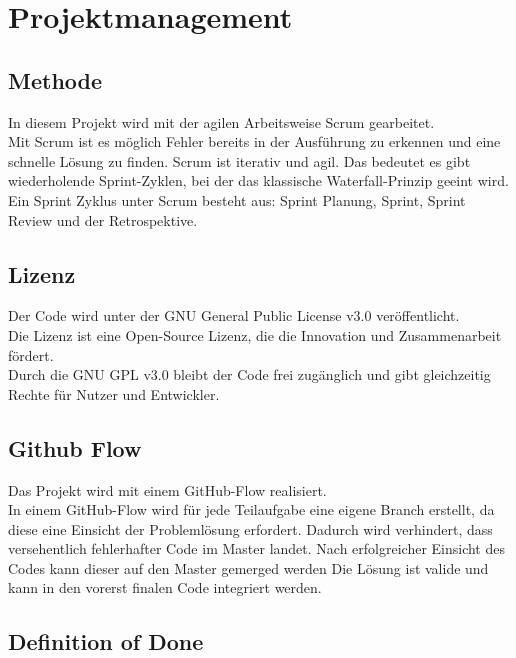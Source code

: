 \chapter{Projektmanagement}\label{ch:projektmanagement}

\section{Methode}\label{sec:methode}

In diesem Projekt wird mit der agilen Arbeitsweise Scrum gearbeitet.\\
Mit Scrum ist es möglich Fehler bereits in der Ausführung zu erkennen und eine schnelle Lösung zu finden.
Scrum ist iterativ und agil. Das bedeutet es gibt wiederholende Sprint-Zyklen, bei der das klassische Waterfall-Prinzip geeint wird.
Ein Sprint Zyklus unter Scrum besteht aus: Sprint Planung, Sprint, Sprint Review und der Retrospektive.

\section{Lizenz}\label{sec:lizenz}

Der Code wird unter der GNU General Public License v3.0 veröffentlicht.\\
Die Lizenz ist eine Open-Source Lizenz, die die Innovation und Zusammenarbeit fördert.\\
Durch die GNU GPL v3.0 bleibt der Code frei zugänglich und gibt gleichzeitig Rechte für Nutzer und Entwickler.  


\section{Github Flow}\label{sec:github-flow}

Das Projekt wird mit einem GitHub-Flow realisiert.\\
In einem GitHub-Flow wird für jede Teilaufgabe eine eigene Branch erstellt, da diese eine Einsicht der Problemlösung erfordert.
Dadurch wird verhindert, dass versehentlich fehlerhafter Code im Master landet. Nach erfolgreicher Einsicht des Codes kann dieser auf den Master gemerged werden \dah{} Die Lösung ist valide und kann in den vorerst finalen Code integriert werden.



\section{Definition of Done}\label{sec:dod}

